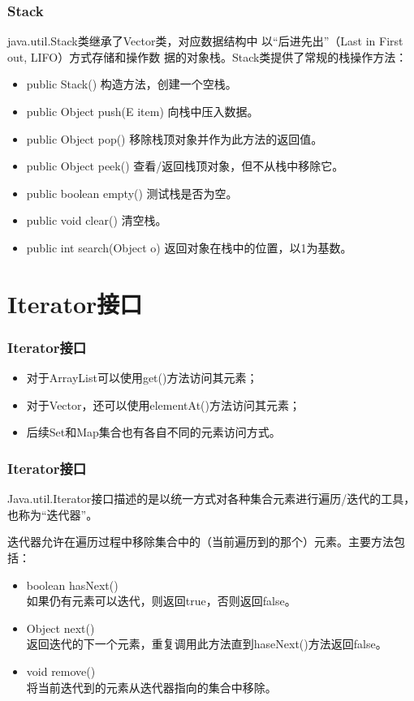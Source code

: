 \begin{frame}[fragile] %
  \frametitle{Stack} java.util.Stack类继承了Vector类，对应数据结构中
  以{\hei\Blue “后进先出”（Last in First out, LIFO）方式存储和操作数
    据的对象栈}。Stack类提供了常规的栈操作方法：

  \begin{itemize}\kai\small
  \item public Stack() 构造方法，创建一个空栈。
  \item public Object push(E item) 向栈中压入数据。
  \item public Object pop() 移除栈顶对象并作为此方法的返回值。
  \item public Object peek() 查看/返回栈顶对象，但不从栈中移除它。
  \item public boolean empty() 测试栈是否为空。
  \item public void clear() 清空栈。
  \item public int search(Object o) 返回对象在栈中的位置，以1为基数。
  \end{itemize}
\end{frame}

\section{Iterator接口}

\begin{frame}[fragile] %
  \frametitle{Iterator接口}

  
  \begin{itemize}
  \item 对于ArrayList可以使用get()方法访问其元素；
  \item 对于Vector，还可以使用elementAt()方法访问其元素；
  \item 后续Set和Map集合也有各自不同的元素访问方式。
  \end{itemize}

\end{frame}

\begin{frame}[fragile] %
  \frametitle{Iterator接口}

  Java.util.Iterator接口描述的是以统一方式对各种集合元素进行遍历/迭代的工具，也称为“{\Blue\hei 迭代器}”。

  迭代器允许在遍历过程中移除集合中的（当前遍历到的那个）元素。主要方法包括：

  \begin{itemize}\small\kai
  \item boolean hasNext()\\
    如果仍有元素可以迭代，则返回true，否则返回false。
  \item Object next()\\
    返回迭代的下一个元素，重复调用此方法直到haseNext()方法返回false。
  \item void remove()\\
    将当前迭代到的元素从迭代器指向的集合中移除。
  \end{itemize}
\end{frame}

